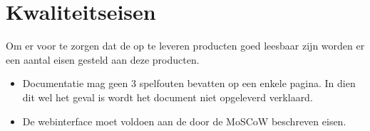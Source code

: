 \chapter{Kwaliteitseisen}
Om er voor te zorgen dat de op te leveren producten goed leesbaar zijn worden er een aantal eisen gesteld aan deze producten.

\begin{itemize}
	\item Documentatie mag geen 3 spelfouten bevatten op een enkele pagina. In dien dit wel het geval is wordt het document niet opgeleverd verklaard.
	\item De webinterface moet voldoen aan de door de MoSCoW beschreven eisen.
\end{itemize}
